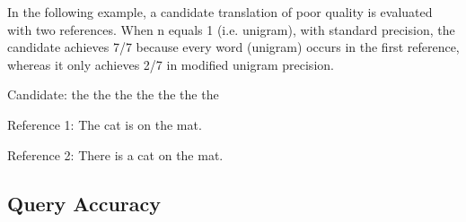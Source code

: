 In the following example, a candidate translation of poor quality is evaluated with two references. When n equals 1 (i.e. unigram), with standard precision, the candidate achieves 7/7 because every word (unigram) occurs in the first reference, whereas it only achieves 2/7 in modified unigram precision. 

Candidate: the the the the the the the

Reference 1: The cat is on the mat.

Reference 2: There is a cat on the mat.



\subsection{Query Accuracy}


